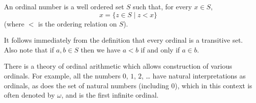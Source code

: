 \documentclass{article}
\begin{document}
An ordinal number is a well ordered set $S$ such that, for every $x \in S$,
$$
x = \{z \in S \mid z < x\}
$$
(where $<$ is the ordering relation on $S$).

It follows immediately from the definition that every ordinal is a transitive set.
Also note that if $a,b\in S$ then we have $a<b$ if and only if $a\in b$.

There is a theory of ordinal arithmetic which allows construction of various ordinals.
For example, all the numbers $0$, $1$, $2$, \ldots
have natural interpretations as ordinals,
as does the set of natural numbers (including $0$),
which in this context is often denoted by $\omega$,
and is the first infinite ordinal.
\end{document}
